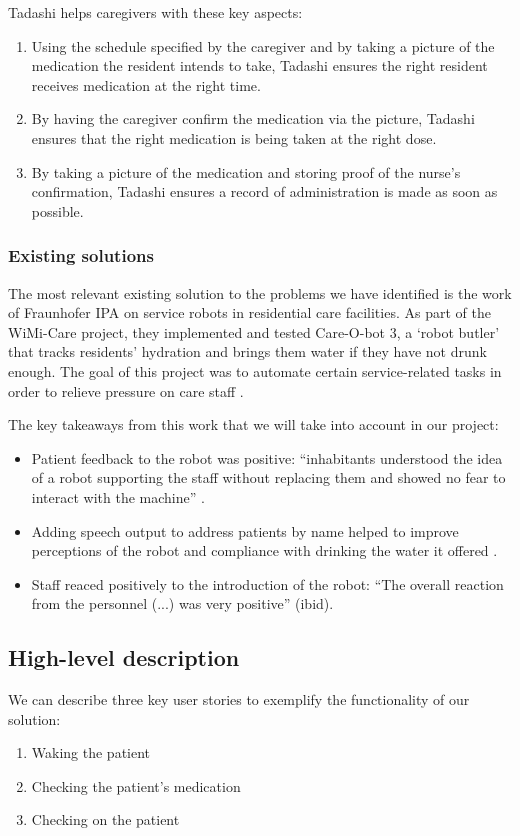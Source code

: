 \documentclass{article}
\begin{document}
Tadashi helps caregivers with these key aspects:
\begin{enumerate}
  \item Using the schedule specified by the caregiver and by taking a picture of the medication the resident intends to take, Tadashi ensures the right resident receives medication at the right time.
  \item By having the caregiver confirm the medication via the picture, Tadashi ensures that the right medication is being taken at the right dose.
  \item By taking a picture of the medication and storing proof of the nurse's confirmation, Tadashi ensures a record of administration is made as soon as possible. 
\end{enumerate}

\subsubsection{Existing solutions}
The most relevant existing solution to the problems we have identified is the work of Fraunhofer IPA on service robots in residential care facilities. As part of the WiMi-Care project, they implemented and tested Care-O-bot 3, a `robot butler' that tracks residents' hydration and brings them water if they have not drunk enough. The goal of this project was to automate certain service-related tasks in order to relieve pressure on care staff \cite{fraunhofer}.

The key takeaways from this work that we will take into account in our project:
\begin{itemize}
\item Patient feedback to the robot was positive: ``inhabitants  understood  the  idea  of  a  robot  supporting  the  staff  without replacing them and showed no fear to interact with the machine'' \cite{springer}. 
\item Adding speech output to address patients by name helped to improve perceptions of the robot and compliance with drinking the water it offered \cite{ieee}. 
\item Staff reaced positively to the introduction of the robot: ``The overall reaction from the personnel (...) was very positive'' (ibid). 
\end{itemize}

\subsection{High-level description} 
We can describe three key user stories to exemplify the functionality of our solution:
\begin{enumerate}
\item Waking the patient
\item Checking the patient's medication
\item Checking on the patient
\end{enumerate}
\end{document}
